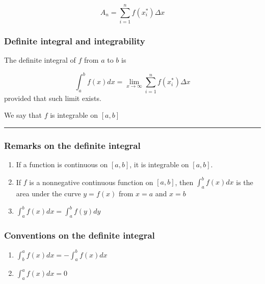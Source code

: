 \documentclass[
]{article}
\begin{document}
\[A_n = \sum_{i=1}^{n}f(x_i^*)\Delta x \]

\hypertarget{definite-integral-and-integrability}{%
\subsubsection{Definite integral and
integrability}\label{definite-integral-and-integrability}}

The definite integral of \(f\) from \(a\) to \(b\) is

\[ \int_a^b f(x)dx = \lim_{x\to\infty}\sum_{i=1}^{n} f(x_i^*)\Delta x \]
provided that such limit exists.

We say that \(f\) is integrable on \([a,b]\)

\begin{center}\rule{0.5\linewidth}{0.5pt}\end{center}

\hypertarget{remarks-on-the-definite-integral}{%
\subsubsection{Remarks on the definite
integral}\label{remarks-on-the-definite-integral}}

\begin{enumerate}
\def\labelenumi{\arabic{enumi}.}
\item
  If a function is continuous on \([a,b]\), it is integrable on
  \([a,b]\).
\item
  If \(f\) is a nonnegative continuous function on \([a,b]\), then
  \(\displaystyle\int_a^b f(x)dx\) is the area under the curve
  \(y=f(x)\) from \(x=a\) and \(x=b\)
\item
  \(\displaystyle\int_a^b f(x)dx = \int_a^b f(y)dy\)
\end{enumerate}

\hypertarget{conventions-on-the-definite-integral}{%
\subsubsection{Conventions on the definite
integral}\label{conventions-on-the-definite-integral}}

\begin{enumerate}
\def\labelenumi{\arabic{enumi}.}
\item
  \(\displaystyle\int_b^a f(x)dx = -\int_a^b f(x)dx\)
\item
  \(\displaystyle\int_a^a f(x)dx = 0\)
\end{enumerate}
\end{document}
